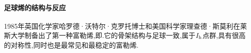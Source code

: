 \documentclass{ctexart}
\begin{document}
\paragraph{足球烯的结构与反应}
1985年英国化学家哈罗德·沃特尔·克罗托博士和美国科学家理查德·斯莫利在莱斯大学制备出了第一种富勒烯,即.它的骨架结构与足球一致,属于$I_{\text h}$点群,具有很高的对称性,同时也是最常见和最稳定的富勒烯.
\begin{figure}[H]
    \centering
\end{figure}
\end{document}
